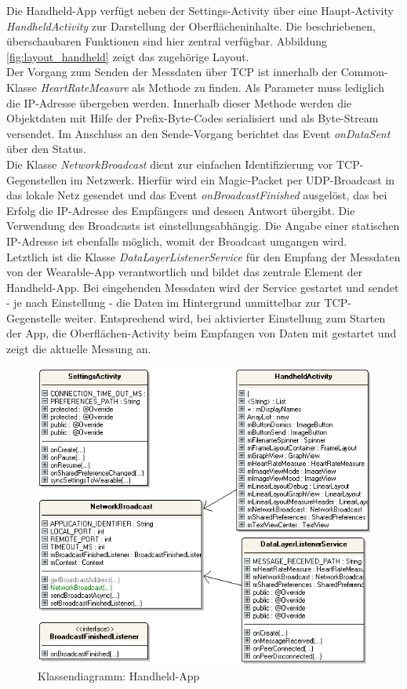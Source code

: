 Die Handheld-App verfügt neben der Settings-Activity über eine Haupt-Activity \textit{HandheldActivity} zur Darstellung der Oberflächeninhalte. Die beschriebenen, überschaubaren Funktionen sind hier zentral verfügbar. Abbildung \ref{fig:layout_handheld} zeigt das zugehörige Layout.
\\[0.5cm]
Der Vorgang zum Senden der Messdaten über TCP ist innerhalb der Common-Klasse \textit{HeartRateMeasure} als Methode zu finden. Als Parameter muss lediglich die IP-Adresse übergeben werden. Innerhalb dieser Methode werden die Objektdaten mit Hilfe der Prefix-Byte-Codes serialisiert und als Byte-Stream versendet. Im Anschluss an den Sende-Vorgang berichtet das Event \textit{onDataSent} über den Status.
\\[0.5cm]
Die Klasse \textit{NetworkBroadcast} dient zur einfachen Identifizierung vor TCP-Gegenstellen im Netzwerk. Hierfür wird ein Magic-Packet per UDP-Broadcast in das lokale Netz gesendet und das Event \textit{onBroadcastFinished} ausgelöst, das bei Erfolg die IP-Adresse des Empfängers und dessen Antwort übergibt. Die Verwendung des Broadcasts ist einstellungsabhängig. Die Angabe einer statischen IP-Adresse ist ebenfalls möglich, womit der Broadcast umgangen wird.
\\[0.5cm]
Letztlich ist die Klasse \textit{DataLayerListenerService} für den Empfang der Messdaten von der Wearable-App verantwortlich und bildet das zentrale Element der Handheld-App. Bei eingehenden Messdaten wird der Service gestartet und sendet - je nach Einstellung - die Daten im Hintergrund unmittelbar zur TCP-Gegenstelle weiter. Entsprechend wird, bei aktivierter Einstellung zum Starten der App, die Oberflächen-Activity beim Empfangen von Daten mit gestartet und zeigt die aktuelle Messung an.
\\[0.5cm]


\bigskip
\begin{figure}[H]
	\centering
	\includegraphics[scale=0.7]{images/classes_handheld.png}
	\caption{Klassendiagramm: Handheld-App}
	\label{fig:classes_handheld}
\end{figure}
\bigskip

